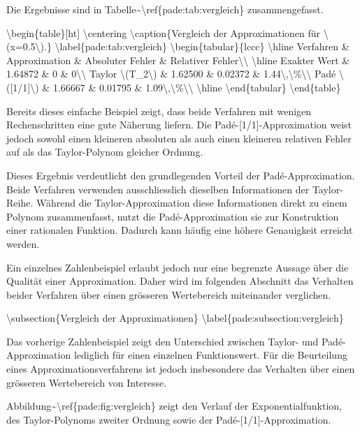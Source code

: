 Die Ergebnisse sind in
Tabelle\textasciitilde\textbackslash ref\{pade:tab:vergleich\}
zusammengefasst.

\textbackslash begin\{table\}{[}ht{]} \textbackslash centering
\textbackslash caption\{Vergleich der Approximationen für
\textbackslash(x=0.5\textbackslash).\}
\textbackslash label\{pade:tab:vergleich\}
\textbackslash begin\{tabular\}\{lccc\} \textbackslash hline Verfahren
\& Approximation \& Absoluter Fehler \& Relativer
Fehler\textbackslash\textbackslash{} \textbackslash hline Exakter Wert
\& 1.64872 \& 0 \& 0\textbackslash\textbackslash{} Taylor
\textbackslash(T\_2\textbackslash) \& 1.62500 \& 0.02372 \&
1.44\textbackslash,\textbackslash\%\textbackslash\textbackslash{} Padé
\textbackslash({[}1/1{]}\textbackslash) \& 1.66667 \& 0.01795 \&
1.09\textbackslash,\textbackslash\%\textbackslash\textbackslash{}
\textbackslash hline \textbackslash end\{tabular\}
\textbackslash end\{table\}

Bereits dieses einfache Beispiel zeigt, dass beide Verfahren mit wenigen
Rechenschritten eine gute Näherung liefern. Die
Padé-{[}1/1{]}-Approximation weist jedoch sowohl einen kleineren
absoluten als auch einen kleineren relativen Fehler auf als das
Taylor-Polynom gleicher Ordnung.

Dieses Ergebnis verdeutlicht den grundlegenden Vorteil der
Padé-Approximation. Beide Verfahren verwenden ausschliesslich dieselben
Informationen der Taylor-Reihe. Während die Taylor-Approximation diese
Informationen direkt zu einem Polynom zusammenfasst, nutzt die
Padé-Approximation sie zur Konstruktion einer rationalen Funktion.
Dadurch kann häufig eine höhere Genauigkeit erreicht werden.

Ein einzelnes Zahlenbeispiel erlaubt jedoch nur eine begrenzte Aussage
über die Qualität einer Approximation. Daher wird im folgenden Abschnitt
das Verhalten beider Verfahren über einen grösseren Wertebereich
miteinander verglichen.

\textbackslash subsection\{Vergleich der Approximationen\}
\textbackslash label\{pade:subsection:vergleich\}

Das vorherige Zahlenbeispiel zeigt den Unterschied zwischen Taylor- und
Padé-Approximation lediglich für einen einzelnen Funktionswert. Für die
Beurteilung eines Approximationsverfahrens ist jedoch insbesondere das
Verhalten über einen grösseren Wertebereich von Interesse.

Abbildung\textasciitilde\textbackslash ref\{pade:fig:vergleich\} zeigt
den Verlauf der Exponentialfunktion, des Taylor-Polynoms zweiter Ordnung
sowie der Padé-{[}1/1{]}-Approximation.


